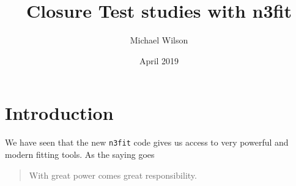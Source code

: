 \documentclass[a4paper]{article}
\title{Closure Test studies with n3fit}
\author{Michael Wilson}
\date{April 2019}
\newcommand{\nfit}{ \texttt{n3fit} }
\begin{document}
\maketitle

\section{Introduction}

We have seen that the new \nfit code gives us access to very powerful and
modern fitting tools. As the saying goes

\begin{quote}
    With great power comes great responsibility.
\end{quote}
\end{document}
